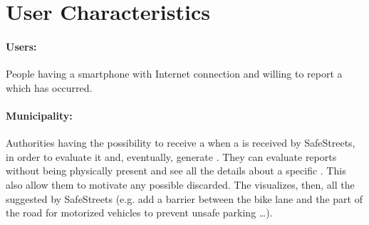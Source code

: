 \documentclass[../../RASD.tex]{subfiles}
\begin{document}
	
	\section{User Characteristics}

		\paragraph{Users:}
		People having a smartphone with Internet connection and willing to report a  which has occurred. 
		\paragraph{Municipality:}
		Authorities having the possibility to receive a  when a  is received by SafeStreets, in order to evaluate it and, eventually, generate . They can evaluate reports without being physically present and see all the details about a specific . This also allow them to motivate any possible  discarded. The  visualizes, then, all the  suggested by SafeStreets (e.g. add a barrier between the bike lane and the part of the road for motorized vehicles to prevent unsafe parking …). 
		
		
\end{document}
